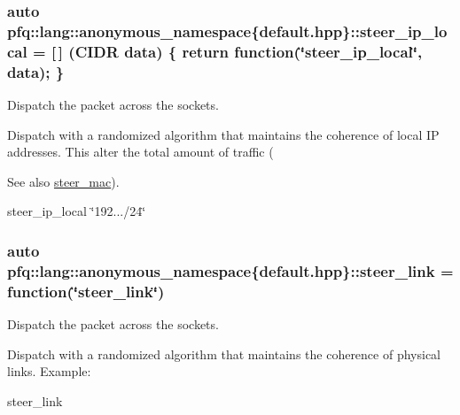 \subsubsection[{\texorpdfstring{steer\+\_\+ip\+\_\+local}{steer_ip_local}}]{\setlength{\rightskip}{0pt plus 5cm}auto pfq\+::lang\+::anonymous\+\_\+namespace\{default.\+hpp\}\+::steer\+\_\+ip\+\_\+local = \mbox{[}$\,$\mbox{]} ({\bf C\+I\+DR} data) \{ return {\bf function}(\char`\"{}steer\+\_\+ip\+\_\+local\char`\"{}, data); \}}\hypertarget{namespacepfq_1_1lang_1_1anonymous__namespace_02default_8hpp_03_a573c7621db324727daedc11fd27ab709}{}\label{namespacepfq_1_1lang_1_1anonymous__namespace_02default_8hpp_03_a573c7621db324727daedc11fd27ab709}


Dispatch the packet across the sockets. 

Dispatch with a randomized algorithm that maintains the coherence of local IP addresses. This alter the total amount of traffic (\begin{DoxySeeAlso}{See also}
\hyperlink{namespacepfq_1_1lang_1_1anonymous__namespace_02default_8hpp_03_ad51e91e3b485c729ac1ba39a46e337a0}{steer\+\_\+mac}).
\end{DoxySeeAlso}
steer\+\_\+ip\+\_\+local \char`\"{}192.../24\char`\"{} 
\subsubsection[{\texorpdfstring{steer\+\_\+link}{steer_link}}]{\setlength{\rightskip}{0pt plus 5cm}auto pfq\+::lang\+::anonymous\+\_\+namespace\{default.\+hpp\}\+::steer\+\_\+link = {\bf function}(\char`\"{}steer\+\_\+link\char`\"{})}\hypertarget{namespacepfq_1_1lang_1_1anonymous__namespace_02default_8hpp_03_ac1f3f9a2caf886a1441e62860a4ca058}{}\label{namespacepfq_1_1lang_1_1anonymous__namespace_02default_8hpp_03_ac1f3f9a2caf886a1441e62860a4ca058}


Dispatch the packet across the sockets. 

Dispatch with a randomized algorithm that maintains the coherence of physical links. Example\+:

steer\+\_\+link 
